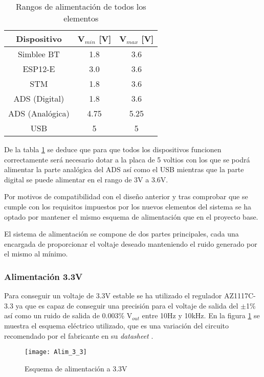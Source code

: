 \begin{table} [h]
	\centering
	\begin{tabular}{|c|c|c|}
	\hline 
	Dispositivo & V$_{min}$ [V] & V$_{max}$ [V] \\ 
	\hline 
	Simblee BT & 1.8 & 3.6 \\ 
	\hline 
	ESP12-E & 3.0 & 3.6 \\ 
	\hline 
	STM & 1.8 & 3.6 \\ 
	\hline 
	ADS (Digital) & 1.8 & 3.6 \\ 
	\hline 
	ADS (Analógica) & 4.75 & 5.25 \\ 
	\hline 
	USB & 5 & 5 \\ 
	\hline 
	\end{tabular} 
	\caption{Rangos de alimentación de todos los elementos}
	\label{tab:Alimentacion}
\end{table}

De la tabla \ref{tab:Alimentacion} se deduce que para que todos los dispositivos funcionen correctamente será necesario dotar a la placa de 5 voltios con los que se podrá alimentar la parte analógica del ADS así como el USB mientras que la parte digital se puede alimentar en el rango de 3V a 3.6V. 

Por motivos de compatibilidad con el diseño anterior y tras comprobar que se cumple con los requisitos impuestos por los nuevos elementos del sistema se ha optado por mantener el mismo esquema de alimentación que en el proyecto base.

El sistema de alimentación se compone de dos partes principales, cada una encargada de proporcionar el voltaje deseado manteniendo el ruido generado por el mismo al mínimo.

\subsubsection{Alimentación 3.3V\label{sec:Alimentacion_3.3V}}
Para conseguir un voltaje de 3.3V estable se ha utilizado el regulador AZ1117C-3.3 ya que es capaz de conseguir una precisión para el voltaje de salida del $\pm$1\% así como un ruido de salida de 0.003\% V$_{out}$ entre 10Hz y 10kHz.
En la figura \ref{fig:Alim_3.3} se muestra el esquema eléctrico utilizado, que es una variación del circuito recomendado por el fabricante en su \textit{datasheet} \cite{Datasheet_3.3}.

\begin{figure} [h]
    \centering
    \texttt{[image: Alim\_3\_3]}
    \caption{Esquema de alimentación a 3.3V}
    \label{fig:Alim_3.3}
\end{figure}

